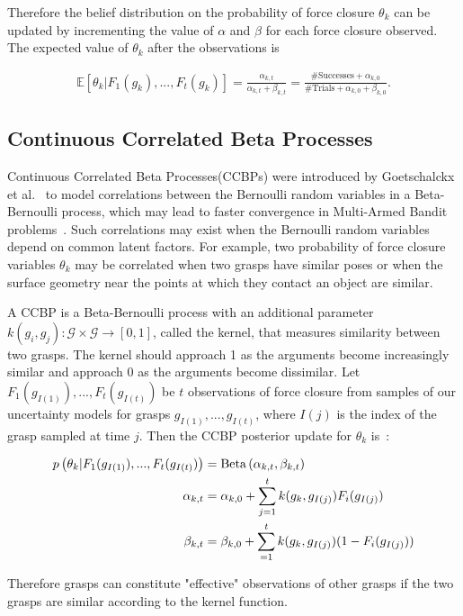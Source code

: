 \noindent Therefore the belief distribution on the probability of force closure $\theta_k$ can be updated by incrementing the value of $\alpha$ and $\beta$ for each force closure observed.
The expected value of $\theta_k$ after the observations is

\begin{align*}
	\mathbb{E} \left[ \theta_k | F_{1}(g_k), ..., F_{t}(g_k) \right] = \frac{\alpha_{k,t}}{\alpha_{k,t} + \beta_{k,t}} = \frac{\mbox{\#Successes} +	
	\alpha_{k,0}}{\mbox{\#Trials}+\alpha_{k,0}+\beta_{k,0}}.
\end{align*}

\subsection{Continuous Correlated Beta Processes}

Continuous Correlated Beta Processes(CCBPs) were introduced by Goetschalckx et al.~\cite{} to model correlations between the Bernoulli random variables in a Beta-Bernoulli process, which may lead to faster convergence in Multi-Armed Bandit problems~\cite{}.
Such correlations may exist when the Bernoulli random variables depend on common latent factors.
For example, two probability of force closure variables $\theta_k$ may be correlated when two grasps have similar poses or when the surface geometry near the points at which they contact an object are similar.

A CCBP is a Beta-Bernoulli process with an additional parameter $k(g_i, g_j) : \mathcal{G} \times \mathcal{G} \rightarrow [0,1]$, called the kernel, that measures similarity between two grasps.
The kernel should approach 1 as the arguments become increasingly similar and approach 0 as the arguments become dissimilar.
Let $F_{1}(g_{I(1)}), ..., F_{t}(g_{I(t)})$ be $t$ observations of force closure from samples of our uncertainty models for grasps $g_{I(1)}, ..., g_{I(t)}$, where $I(j)$ is the index of the grasp sampled at time $j$.
Then the CCBP posterior update for $\theta_k$ is~\cite{}:

\vspace{-2ex}
\begin{align*}
	p \left(\theta_k | F_{1}(g_{I(1)}), ..., F_{t}(g_{I(t)}) \right) &= \text{Beta}\left( \alpha_{k,t}, \beta_{k,t} \right) \\
	\alpha_{k,t} &= \alpha_{k,0} + \sum \limits_{j=1}^t k(g_k, g_{I(j)}) F_{i}(g_{I(j)}) \\
	\beta_{k,t} &= \beta_{k,0} + \sum \limits_{=1}^t k(g_k, g_{I(j)}) (1 - F_{i}(g_{I(j)}))
\end{align*}

\noindent Therefore grasps can constitute "effective" observations of other grasps if the two grasps are similar according to the kernel function.
